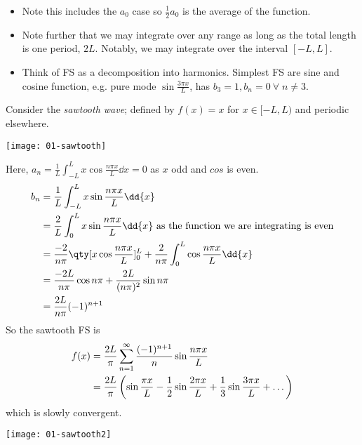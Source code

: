 \begin{note}
    \begin{itemize}
        \item  Note this includes the $a_0$ case so $\frac{1}{2} a_0$ is the average of the function.
        \item Note further that we may integrate over any range as long as the total length is one period, $2L$.
        Notably, we may integrate over the interval $[-L, L]$.
        \item Think of FS as a decomposition into harmonics.
        Simplest FS are sine and cosine function, e.g. pure mode $\sin \frac{3 \pi x}{L}$, has $b_3 = 1, b_n = 0 \ \forall \; n \neq 3$.
    \end{itemize} 
\end{note} 

\begin{example}
    Consider the \textit{sawtooth wave}; defined by $f(x) = x$ for $x \in [-L, L)$ and periodic elsewhere.
    {\par \centering \texttt{[image: 01-sawtooth]} \par}
    Here,
    $a_n = \frac{1}{L} \int_{-L}^L x \cos \frac{n\pi x}{L} \dd{x} = 0$ as $x$ odd and $cos$ is even.
    \begin{align*}
        b_n &= \frac{1}{L} \int_{-L}^L x \sin \frac{n\pi x}{L} \dd{x} \\
        &= \frac{2}{L} \int_0^L x \sin \frac{n\pi x}{L} \dd{x} \text{ as the function we are integrating is even} \\
        &= \frac{-2}{n\pi} \qty[x \cos \frac{n\pi x}{L}]_0^L + \frac{2}{n\pi} \int_0^L \cos \frac{n \pi x}{L} \dd{x} \\
        &= \frac{-2L}{n\pi} \cos n \pi + \frac{2L}{(n\pi)^2} \sin n \pi \\
        &= \frac{2L}{n\pi} (-1)^{n+1}
    \end{align*}
    So the sawtooth FS is
    \begin{align} \label{eq:1.6}
        f(x) &= \frac{2L}{\pi} \sum_{n=1}^{\infty} \frac{(-1)^{n+1}}{n} \sin \frac{n \pi x}{L} \\
        &= \frac{2L}{\pi} \left( \sin \frac{\pi x}{L} - \frac{1}{2} \sin \frac{2 \pi x}{L} + \frac{1}{3} \sin \frac{3 \pi x}{L} + \dots \right) \notag
    \end{align} 
    which is slowly convergent.
    {\par \centering \texttt{[image: 01-sawtooth2]} \par}
\end{example}

